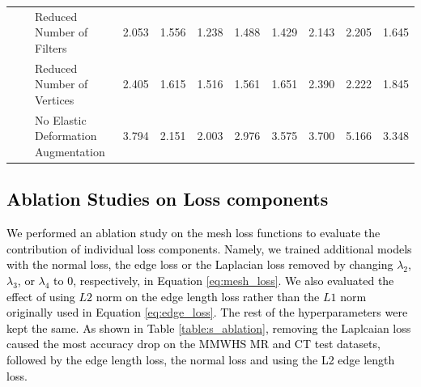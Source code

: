 \documentclass[times,review,preprint,authoryear]{elsarticle}
\begin{document}
\begin{table}[H]
{\begin{tabular}{lllrrrrrrrr}
   &         & Reduced Number of Filters &   2.053 &   1.556 &   1.238 &   1.488 &   1.429 &   2.143 &   2.205 &   1.645 \\
   &         & Reduced Number of Vertices &   2.405 &   1.615 &   1.516 &   1.561 &   1.651 &   2.390 &   2.222 &   1.845 \\
   &         & No Elastic Deformation Augmentation &   3.794 &   2.151 &   2.003 &   2.976 &   3.575 &   3.700 &   5.166 &   3.348 \\
\bottomrule
\end{tabular}
}
\end{table}

\textcolor{black}{
\subsection{Ablation Studies on Loss components}
}

\textcolor{black}{
We performed an ablation study on the mesh loss functions to evaluate the contribution of individual loss components. Namely, we trained additional models with the normal loss, the edge loss or the Laplacian loss removed by changing $\lambda_2$, $\lambda_3$, or $\lambda_4$ to 0, respectively, in Equation \ref{eq:mesh_loss}. We also evaluated the effect of using $L2$ norm on the edge length loss rather than the $L1$ norm originally used in Equation \ref{eq:edge_loss}. The rest of the hyperparameters were kept the same. As shown in Table \ref{table:s_ablation}, removing the Laplcaian loss caused the most accuracy drop on the MMWHS MR and CT test datasets, followed by the edge length loss, the normal loss and using the L2 edge length loss. }
\end{document}
